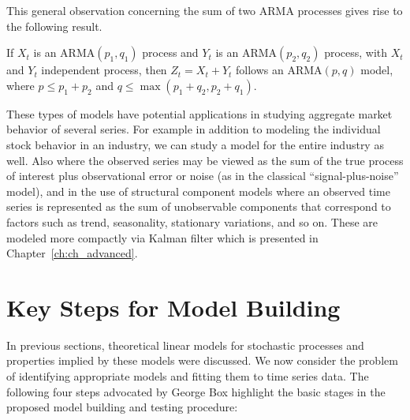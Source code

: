 This general observation concerning the sum of two ARMA processes gives rise to the following result. 


\begin{result}[Aggregation] \label{thm:agg}
If $X_t$ is an ARMA$(p_1,q_1)$ process and $Y_t$ is an ARMA$(p_2, q_2)$ process, with $X_t$ and $Y_t$ independent process, then $Z_t = X_t + Y_t$ follows an ARMA$(p,q)$ model, where $p \leq p_1 + p_2$ and $q \leq \max(p_1 + q_2, p_2 + q_1)$.
\end{result}


These types of models have potential applications in studying aggregate market behavior of several series. For example in addition to modeling the individual stock behavior in an industry, we can study a model for the entire industry as well. Also where the observed series may be viewed as the sum of the true process of interest plus observational error or noise (as in the classical ``signal-plus-noise'' model), and in the use of structural component models where an observed time series is represented as the sum of unobservable components that correspond to factors such as trend, seasonality, stationary variations, and so on. These are modeled more compactly via Kalman filter which is presented in Chapter~\ref{ch:ch_advanced}. 



\section{Key Steps for Model Building \label{sec:key_step}} \label{in:validation1}

In previous sections, theoretical linear models for stochastic processes and properties implied by these models were discussed. We now consider the problem of identifying appropriate models and fitting them to time series data. The following four steps advocated by George Box highlight the basic stages in the proposed model building and testing procedure:

